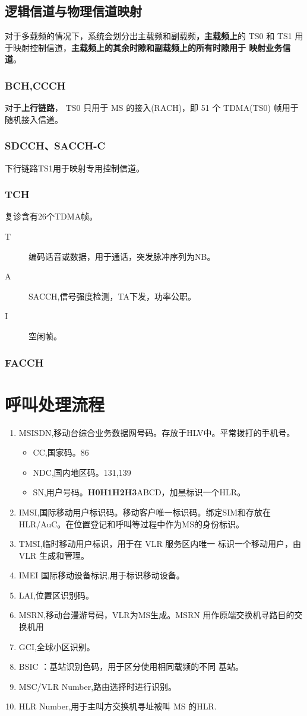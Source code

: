 \subsection{逻辑信道与物理信道映射}
对于多载频的情况下，系统会划分出主载频和副载频\textbf{，主载频上}的 TS0 和 TS1 用于映射控制信道，\textbf{主载频上的其余时隙和副载频上的所有时隙用于
映射业务信道}。
\subsubsection{BCH,CCCH}
对于\textbf{上行链路}， TS0 只用于 MS 的接入(RACH)，即 51 个
TDMA(TS0) 帧用于随机接入信道。
\subsubsection{SDCCH、SACCH-C}
下行链路TS1用于映射专用控制信道。
\subsubsection{TCH}
复诊含有26个TDMA帧。
\begin{description}
	\item[T] 编码话音或数据，用于通话，突发脉冲序列为NB。
	\item[A] SACCH,信号强度检测，TA下发，功率公职。
	\item[I] 空闲帧。
\end{description}
\subsubsection{FACCH}

\section{呼叫处理流程}
\begin{enumerate}
	\item MSISDN,移动台综合业务数据网号码。存放于HLV中。平常拨打的手机号。
	\begin{itemize}
		\item CC,国家码。86
		\item NDC,国内地区码。131,139
		\item SN,用户号码。\textbf{H0H1H2H3}ABCD，加黑标识一个HLR。
	\end{itemize}
	\item IMSI,国际移动用户标识码。移动客户唯一标识码。绑定SIM和存放在HLR/AuC。在位置登记和呼叫等过程中作为MS的身份标识。
	\item TMSI,临时移动用户标识，用于在 VLR 服务区内唯一
	标识一个移动用户，由 VLR 生成和管理。
	\item IMEI 国际移动设备标识,用于标识移动设备。
	\item LAI,位置区识别码。
	\item MSRN,移动台漫游号码，VLR为MS生成。MSRN 用作原端交换机寻路目的交换机用
	\item GCI,全球小区识别。
	\item BSIC ：基站识别色码，用于区分使用相同载频的不同
	基站。
	\item MSC/VLR Number,路由选择时进行识别。
	\item HLR Number,用于主叫方交换机寻址被叫 MS 的HLR.
\end{enumerate}
